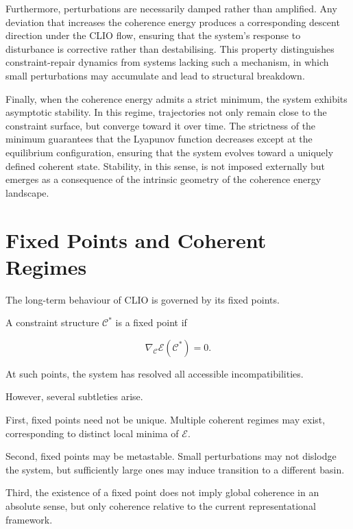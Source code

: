 \documentclass[11pt,openany]{book}
\begin{document}
Furthermore, perturbations are necessarily damped rather
than amplified.  Any deviation that increases the coherence
energy produces a corresponding descent direction under the
CLIO flow, ensuring that the system’s response to
disturbance is corrective rather than destabilising.  This
property distinguishes constraint-repair dynamics from
systems lacking such a mechanism, in which small
perturbations may accumulate and lead to structural
breakdown.

Finally, when the coherence energy admits a strict minimum,
the system exhibits asymptotic stability.  In this regime,
trajectories not only remain close to the constraint
surface, but converge toward it over time.  The strictness
of the minimum guarantees that the Lyapunov function
decreases except at the equilibrium configuration,
ensuring that the system evolves toward a uniquely defined
coherent state.  Stability, in this sense, is not imposed
externally but emerges as a consequence of the intrinsic
geometry of the coherence energy landscape.

\section{Fixed Points and Coherent Regimes}
\label{sec:fixed-points}

The long-term behaviour of CLIO is governed by its fixed
points.

\begin{definition}
A constraint structure $\mathcal{C}^*$ is a fixed point if

$$
\nabla_{\mathcal{C}} \mathcal{E}(\mathcal{C}^*) = 0.
$$

\end{definition}

At such points, the system has resolved all accessible
incompatibilities.

However, several subtleties arise.

First, fixed points need not be unique.  Multiple coherent
regimes may exist, corresponding to distinct local minima
of $\mathcal{E}$.

Second, fixed points may be metastable.  Small perturbations
may not dislodge the system, but sufficiently large ones
may induce transition to a different basin.

Third, the existence of a fixed point does not imply global
coherence in an absolute sense, but only coherence relative
to the current representational framework.
\end{document}
